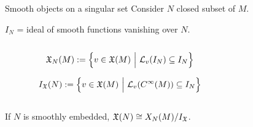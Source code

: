 \documentclass[10pt]{beamer}
\begin{document}
    
      \begin{frame}[shrink]{Smooth objects on a singular set}
        Consider $N$ closed subset of $M$.
        \vfill
        \pause
        \begin{defblock}
          $I_N$ = ideal of smooth functions vanishing over $N$.
        \end{defblock}
    \vfill
    \pause
    
        \begin{columns}[T]
          \setlength{\belowdisplayskip}{5pt}
          \begin{column}{.65\linewidth}
            \centering \it
            \begin{defblock}[v.f tangent to $N$]
              \begin{displaymath}
                \mathfrak{X}_N(M):=
                \left\lbrace
                v \in \mathfrak{X}(M)
                ~\Big\vert~
                \mathcal{L}_v(I_N) \subseteq I_N
                \right\rbrace
              \end{displaymath}
            \end{defblock}
            \begin{defblock}[v.f vanishing on $N$]
              \begin{displaymath}
                I_{\mathfrak{X}}(N):=
                \left\lbrace
                v \in \mathfrak{X}(M)
                ~\Big\vert~
                \mathcal{L}_v(C^\infty(M)) \subseteq I_N
                \right\rbrace
              \end{displaymath}
            \end{defblock}
          \end{column}
          \begin{column}{.35\linewidth}
            \centering
            
          \end{column}
        \end{columns}
    \pause
    
    
        \begin{tcolorbox}[
          enhanced,frame hidden,borderline={0.5pt}{0pt}{blue},
          arc=5pt,colback=white,
          colbacktitle=white,]
           If $N$ is smoothly embedded,  $\mathfrak{X}(N)\cong {X_N(M)}/{I_{\mathfrak{X}}}$.
        \end{tcolorbox}
    

\end{frame}
\end{document}
